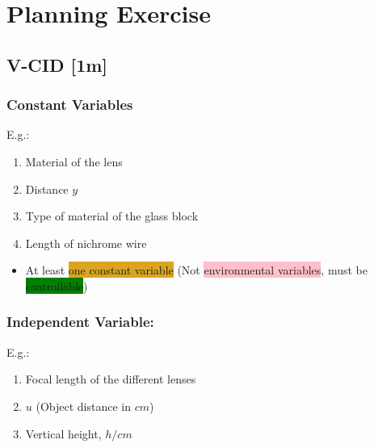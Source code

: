 \documentclass[oneside]{book}
\begin{document}
\pagecolor{white}


\footnotesize
\begingroup
\let\clearpage\relax
\vspace{1cm}
\chapter{Planning Exercise}
\mainmatter
\endgroup
\raggedright
\section{V-CID [1m]}
\subsection{Constant Variables}
E.g.:
\begin{enumerate}
    \item Material of the lens
    \item Distance \(y\) 
    \item Type of material of the glass block
    \item Length of nichrome wire
\end{enumerate}
\begin{itemize}[label=\(\square\)]
    \item At least \colorbox{Goldenrod}{one constant variable} (Not \colorbox{pink}{environmental variables}, must be \colorbox{green}{controllable})
\end{itemize}
\subsection{Independent Variable:}
E.g.:
\begin{enumerate}
    \item Focal length of the different lenses
    \item \(u\) (Object distance in \(cm\))
    \item Vertical height, \(h/cm\) 
\end{enumerate}
\end{document}
